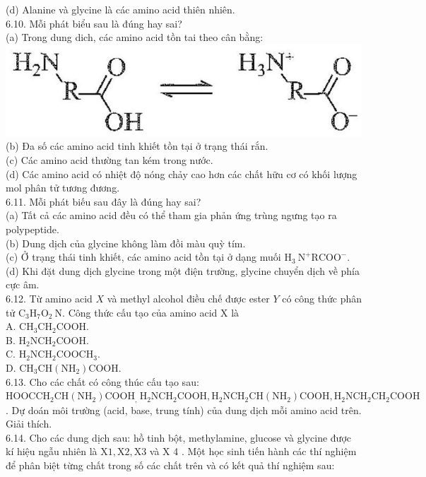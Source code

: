 \documentclass[10pt]{article}
\begin{document}
(d) Alanine và glycine là các amino acid thiên nhiên.\\
6.10. Mỗi phát biểu sau là đúng hay sai?\\
(a) Trong dung dich, các amino acid tồn tai theo cân bằng:\\
\includegraphics[max width=\textwidth, center]{2025_10_23_80c1361fcdcd395cad8eg-20}\\
(b) Đa số các amino acid tinh khiết tồn tại ở trạng thái rắn.\\
(c) Các amino acid thường tan kém trong nước.\\
(d) Các amino acid có nhiệt độ nóng chảy cao hơn các chất hữu cơ có khối lượng mol phân tử tương đương.\\
6.11. Mỗi phát biếu sau đây là đúng hay sai?\\
(a) Tất cả các amino acid đều có thể tham gia phản ứng trùng ngưng tạo ra polypeptide.\\
(b) Dung dịch của glycine không làm đồi màu quỳ tím.\\
(c) Ở trạng thái tinh khiết, các amino acid tồn tại ở dạng muối $\mathrm{H}_{3} \mathrm{~N}^{+} \mathrm{RCOO}^{-}$.\\
(d) Khi đặt dung dịch glycine trong một điện trường, glycine chuyển dịch về phía cực âm.\\
6.12. Từ amino acid $X$ và methyl alcohol điều chế được ester $Y$ có công thức phân tử $\mathrm{C}_{3} \mathrm{H}_{7} \mathrm{O}_{2} \mathrm{~N}$. Công thức cấu tạo của amino acid X là\\
A. $\mathrm{CH}_{3} \mathrm{CH}_{2} \mathrm{COOH}$.\\
B. $\mathrm{H}_{2} \mathrm{NCH}_{2} \mathrm{COOH}$.\\
C. $\mathrm{H}_{2} \mathrm{NCH}_{2} \mathrm{COOCH}_{3}$.\\
D. $\mathrm{CH}_{3} \mathrm{CH}\left(\mathrm{NH}_{2}\right) \mathrm{COOH}$.\\
6.13. Cho các chất có công thúc cấu tạo sau: $\mathrm{HOOCCH}_{2} \mathrm{CH}\left(\mathrm{NH}_{2}\right) \mathrm{COOH}_{\text {, }} \mathrm{H}_{2} \mathrm{NCH}_{2} \mathrm{COOH}, \mathrm{H}_{2} \mathrm{NCH}_{2} \mathrm{CH}\left(\mathrm{NH}_{2}\right) \mathrm{COOH}, \mathrm{H}_{2} \mathrm{NCH}_{2} \mathrm{CH}_{2} \mathrm{COOH}$. Dự doán môi trường (acid, base, trung tính) của dung dịch mỗi amino acid trên. Giải thích.\\
6.14. Cho các dung dịch sau: hồ tinh bột, methylamine, glucose và glycine được kí hiệu ngẫu nhiên là $\mathrm{X} 1, \mathrm{X} 2, \mathrm{X} 3$ và X 4 . Một học sinh tiến hành các thí nghiệm để phân biệt từng chất trong số các chất trên và có kết quả thí nghiệm sau:
\end{document}
